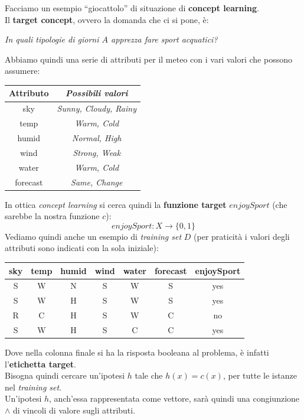 \documentclass[a4paper,12pt, oneside]{book}
\begin{document}
\begin{esempio}
  Facciamo un esempio ``giocattolo'' di situazione di \textbf{concept
    learning}.\\ 
  Il \textbf{target concept}, ovvero la domanda che ci si pone, è:\\
  \begin{center}
    \textit{In quali tipologie di giorni $A$ apprezza fare sport acquatici?}
  \end{center}
  Abbiamo quindi una serie di attributi per il meteo con i vari valori che
  possono assumere:
  \begin{table}[H]
    \centering
    \begin{tabular}[H]{|c|c|}
      \hline
      \textbf{Attributo} & \textbf{\textit{Possibili valori}}\\
      \hline
      sky & \textit{Sunny, Cloudy, Rainy}\\
      temp & \textit{Warm, Cold}\\
      humid & \textit{Normal, High}\\
      wind & \textit{Strong, Weak}\\
      water & \textit{Warm, Cold}\\
      forecast & \textit{Same, Change}\\
      \hline
    \end{tabular}
  \end{table}
  In ottica \textit{concept learning} si cerca quindi la \textbf{funzione
    target} $enjoySport$ (che sarebbe la nostra funzione $c$): 
  \[enjoySport:X\to\{0,1\}\]
  Vediamo quindi anche un esempio di \textit{training set} $D$ (per praticità i
  valori degli attributi sono indicati con la sola iniziale):
  \begin{table}[H]
    \centering
    \begin{tabular}[H]{|c|c|c|c|c|c|c|}
      \hline
      \textbf{sky} & \textbf{temp} & \textbf{humid} & \textbf{wind} &         
      \textbf{water} & \textbf{forecast} & \textbf{enjoySport}\\
      \hline
      S & W & N & S & W & S & \color{darkgreen} yes\\
      S & W & H & S & W & S & \color{darkgreen} yes\\
      R & C & H & S & W & C & \color{red} no\\
      S & W & H & S & C & C & \color{darkgreen} yes\\
      \hline
    \end{tabular}
  \end{table}
  Dove nella colonna finale si ha la risposta booleana al problema, è infatti
  l'\textbf{etichetta target}.\\
  Bisogna quindi cercare un'ipotesi $h$ tale che $h(x)=c(x)$,
  per tutte le istanze nel \textit{training set}.\\
  Un'ipotesi $h$, anch'essa rappresentata come vettore, sarà quindi una
  congiunzione $\land$ di vincoli di valore sugli attributi.
  \label{es:tab}
\end{esempio}
\end{document}
